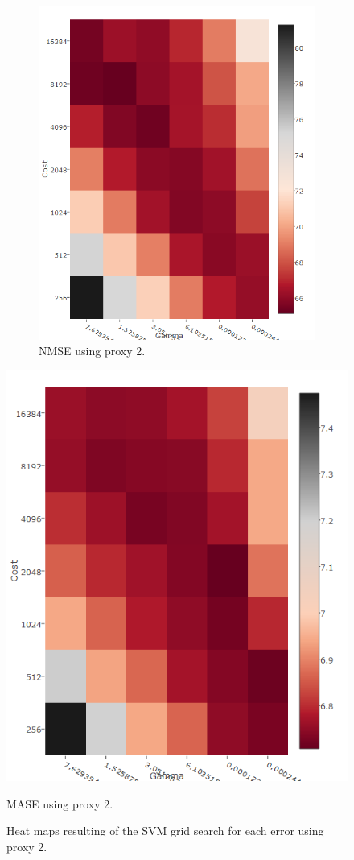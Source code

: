 \begin{center}
\begin{figure}[!h]
{\begin{subfigure}{.55\linewidth}
  \includegraphics[width=\linewidth, height = 0.33\textheight]{img/10yNMSEma.png}
  \caption{NMSE using proxy 2.}
  \label{fig:heat22a}
\end{subfigure}}
  \centering
  \includegraphics[width=0.55\linewidth, height = 0.33\textheight]{img/10yMASEma.png}
  \caption{MASE using proxy 2.}
  \label{fig:heat33a}
\caption{Heat maps resulting of the SVM grid search for each error using proxy 2.}
\label{fig:heat10yp2}
\end{figure}\end{center}
